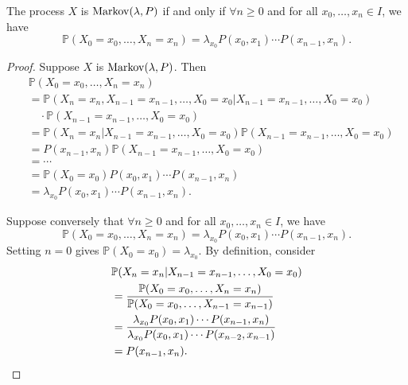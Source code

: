 \documentclass[a4paper,11pt]{article}
\begin{document}
\begin{theorem}\label{thm:1.1}
    The process $X$ is $ \operatorname{Markov}(\lambda,P) $ if and only if $ \forall n\ge 0 $ and for all $ x_0,\dots,x_n\in I $, we have 
    \[
        \mathbb{P}(X_0=x_0,\dots,X_n=x_n) = \lambda_{x_0} P(x_0,x_1)\cdots P(x_{n-1},x_n).
    \]
\end{theorem}
\begin{proof}
    Suppose $ X $ is $ \operatorname{Markov}(\lambda,P) $. Then 
    \begin{align*}
        &\mathbb{P}(X_0=x_0,\dots,X_n=x_n)\\ &= \mathbb{P}(X_n=x_n,X_{n-1}=x_{n-1},\dots, X_0=x_0|X_{n-1}=x_{n-1},\dots, X_0=x_0)\\
        &\quad\cdot \mathbb{P}(X_{n-1}=x_{n-1},\dots, X_0=x_0 )\\
        &= \mathbb{P}(X_n=x_n|X_{n-1}=x_{n-1},\dots, X_0=x_0)\mathbb{P}(X_{n-1}=x_{n-1},\dots, X_0=x_0 )\\ 
        &= P(x_{n-1},x_n)\mathbb{P}(X_{n-1}=x_{n-1},\dots, X_0=x_0 )\\ 
        &=\cdots\\ 
        &= \mathbb{P}(X_0=x_0) P(x_0,x_1)\cdots P(x_{n-1},x_n)\\ 
        &= \lambda_{x_0} P(x_0,x_1)\cdots P(x_{n-1},x_n).
    \end{align*}

    Suppose conversely that $ \forall n\ge 0 $ and for all $ x_0,\dots,x_n\in I $, we have 
    \[
        \mathbb{P}(X_0=x_0,\dots,X_n=x_n) = \lambda_{x_0} P(x_0,x_1)\cdots P(x_{n-1},x_n).
    \]
    Setting $n=0$ gives $ \mathbb{P}(X_0=x_0)=\lambda_{x_0} $. By definition, consider 
    \begin{align*}
        &\mathbb{P}(X_n=x_n|X_{n-1}=x_{n-1},\dots, X_0=x_0)\\ &= \frac{\mathbb{P}(X_0=x_0,\dots,X_n=x_n)}{\mathbb{P}(X_0=x_0,\dots,X_{n-1}=x_{n-1})}\\ 
        &= \frac{\lambda_{x_0} P(x_0,x_1)\cdots P(x_{n-1},x_n)}{\lambda_{x_0} P(x_0,x_1)\cdots P(x_{n-2},x_{n-1})}\\ 
        &= P(x_{n-1},x_n).\qedhere
    \end{align*}
\end{proof}
\end{document}

